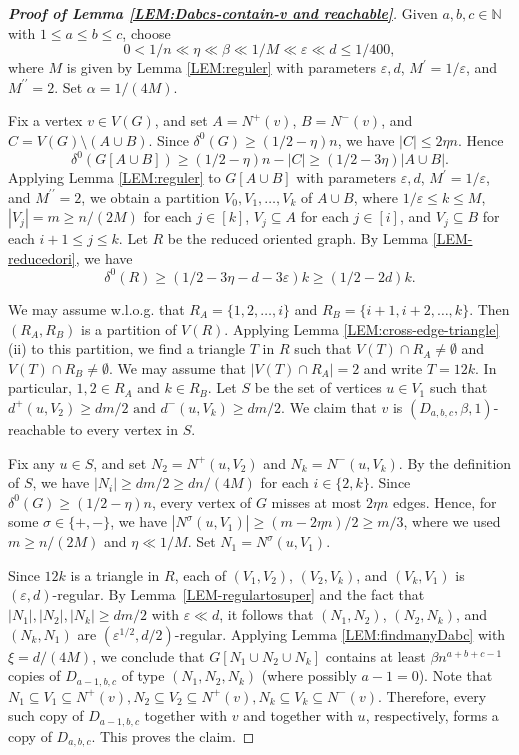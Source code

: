 \documentclass[11pt,a4paper,reqno]{amsart}
\theoremstyle{definition} %
\begin{document}
\begin{proof}[\textbf{Proof of Lemma \ref{LEM:Dabcs-contain-v and reachable}}] 
Given $a,b,c\in \mathbb{N}$ with $1\leqslant a\leqslant b\leqslant c$, choose
$$
0<1/n\ll \eta \ll\beta \ll 1/M\ll \varepsilon \ll d\leqslant 1/400,
$$
where $M$ is given by Lemma \ref{LEM:reguler} with parameters $\varepsilon,d$, $M^\prime=1/\varepsilon$, and $M^{\prime\prime}=2$. Set $\alpha=1/(4M)$.

Fix a vertex $v\in V(G)$, and set $A=N^{+}(v)$, $B=N^{-}(v)$, and $C=V(G)\setminus (A\cup B)$. Since $\delta^{0}(G)\geqslant (1/2-\eta)n$, we have $|C|\leqslant 2\eta n$. Hence
$$
\delta^{0}(G[A\cup B])\geqslant (1/2-\eta)n-|C|
\geqslant (1/2-3\eta)|A\cup B|.
$$
Applying Lemma \ref{LEM:reguler} to $G[A\cup B]$ with parameters $\varepsilon,d$, $M^\prime=1/\varepsilon$, and $M^{\prime\prime}=2$, we obtain a partition $V_0,V_1,\ldots,V_k$ 
of $A\cup B$, where  $1/\varepsilon \leqslant k\leqslant M$, $|V_j|=m\geqslant n/(2M)$ for each $j\in[k]$, $V_j\subseteq A$ for each $j\in[i]$, and $V_j\subseteq B$ for each $i+1\leqslant j\leqslant k$. Let $R$ be the reduced oriented graph. By Lemma \ref{LEM-reducedori}, we have 
$$
\delta^0(R)\geqslant (1/2-3\eta-d-3\varepsilon)k\geqslant (1/2-2d)k.
$$

We may  assume w.l.o.g. that $R_A=\{1,2,\ldots,i\}$ and $R_B=\{i+1,i+2,\ldots,k\}$. Then $(R_A,R_B)$ is a partition of $V(R)$. Applying Lemma \ref{LEM:cross-edge-triangle} (ii) to this partition, we find a triangle $T$ in $R$ such that $V(T)\cap R_A\neq \emptyset$ and $V(T)\cap R_B\neq \emptyset$. We  may assume that $|V(T)\cap R_A|=2$ and write $T=12k$. In particular, $1,2\in R_A$ and $k\in R_B$. Let $S$ be the set of vertices $u\in V_1$ such that $
d^{+}(u,V_2)\geqslant dm/2
 \text{ and } 
d^{-}(u,V_k)\geqslant dm/2$. 
We claim that $v$ is $(D_{a,b,c},\beta,1)$-reachable to every vertex in $S$.

Fix any $u\in S$, and set $N_2=N^{+}(u,V_2)$ and $N_k=N^{-}(u,V_k)$. By the definition of $S$, we have $|N_i|\geqslant dm/2\geqslant dn/(4M)$ for each $i\in\{2,k\}$. Since $\delta^0(G)\geqslant (1/2-\eta)n$, every vertex of $G$ misses at most $2\eta n$ edges. Hence, for some $\sigma\in\{+,-\}$, we have $
|N^\sigma(u,V_1)|\geqslant (m-2\eta n)/2\geqslant m/3$, 
where we used $m\geqslant n/(2M)$ and $\eta\ll 1/M$. Set $N_1=N^\sigma(u,V_1)$.

Since $12k$ is a triangle in $R$, each of $(V_1,V_2)$, $(V_2,V_k)$, and $(V_k,V_1)$ is $(\varepsilon,d)$-regular. By Lemma~\ref{LEM-regulartosuper} and the fact that $|N_1|,|N_2|,|N_k|\geqslant dm/2$ with $\varepsilon\ll d$, it follows that $(N_1,N_2)$, $(N_2,N_k)$, and $(N_k,N_1)$ are $(\varepsilon^{1/2},d/2)$-regular. Applying Lemma \ref{LEM:findmanyDabc} with $\xi=d/(4M)$, we conclude that $G[N_1\cup N_2\cup N_k]$ contains at least $\beta n^{a+b+c-1}$ copies of $D_{a-1,b,c}$ of type $(N_1,N_2,N_k)$ (where possibly $a-1=0$). Note that $
N_1\subseteq V_1\subseteq N^+(v), 
N_2\subseteq V_2\subseteq N^+(v), 
N_k\subseteq V_k\subseteq N^-(v)$.
Therefore, every such copy of $D_{a-1,b,c}$ together with $v$ and together with $u$, respectively, forms a copy of $D_{a,b,c}$. This proves the claim.


\end{proof}
\end{document}
